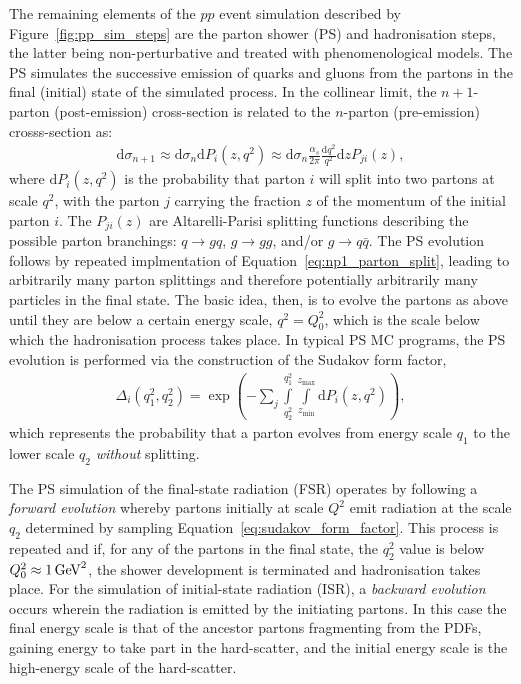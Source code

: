 The remaining elements of the $pp$ event simulation described by Figure~\ref{fig:pp_sim_steps} are the parton shower (PS)
and hadronisation steps, the latter being non-perturbative and treated with phenomenological models.
The PS simulates the successive emission of quarks and gluons from the partons in the final (initial) state of the
simulated process.
In the collinear limit, the $n+1$-parton (post-emission) cross-section is related to the $n$-parton (pre-emission) crosss-section
as:
\begin{align}
    \mathrm{d}\sigma_{n+1} \approx \mathrm{d}\sigma_n \mathrm{d}P_i(z, q^2) \approx \mathrm{d}\sigma_n \frac{\alpha_s}{2\pi} \frac{\mathrm{d}q^2}{q^2} \mathrm{d}z P_{ji}(z),
    \label{eq:np1_parton_split}
\end{align}
where $\mathrm{d}P_i(z,q^2)$ is the probability that parton $i$ will split into two partons at scale $q^2$, with the parton $j$ carrying the
fraction $z$ of the momentum of the initial parton $i$.
The $P_{ji}(z)$ are Altarelli-Parisi splitting functions describing the possible parton branchings: $q \rightarrow gq$, $g \rightarrow gg$, 
and/or $g \rightarrow q\bar{q}$.
The PS evolution follows by repeated implmentation of Equation~\ref{eq:np1_parton_split}, leading to arbitrarily many
parton splittings and therefore potentially arbitrarily many particles in the final state.
The basic idea, then, is to evolve the partons as above until they are below a certain energy scale, $q^2 = Q_0^2$, which is the scale
below which the hadronisation process takes place.
In typical PS MC programs, the PS evolution is performed via the construction of the Sudakov form factor,
\begin{align}
    \Delta_i(q_1^2, q_2^2) = \exp \left ( - \sum\limits_j \int\limits_{q_2^2}^{q_1^2} \int\limits_{z_{\text{min}}}^{z_{\text{max}}} \mathrm{d}P_i(z,q^2) \right),
    \label{eq:sudakov_form_factor}
\end{align}
which represents the probability that a parton evolves from energy scale $q_1$ to the lower scale $q_2$ \textit{without} splitting.

The PS simulation of the final-state radiation (FSR) operates by following a \textit{forward evolution} whereby partons initially at scale $Q^2$
emit radiation at the scale $q_2$ determined by sampling Equation~\ref{eq:sudakov_form_factor}. This process is repeated and if,
for any of the partons in the final state, the $q_2^2$ value is below $Q_0^2 \approx 1\,\text{Ge\kern -0.1em V}^2$, the shower development is terminated
and hadronisation takes place.
For the simulation of initial-state radiation (ISR), a \textit{backward evolution} occurs wherein the radiation is emitted
by the initiating partons. In this case the final energy scale is that of the ancestor partons fragmenting from the PDFs, gaining energy to take part
in the hard-scatter, and the initial energy scale is the high-energy scale of the hard-scatter.

